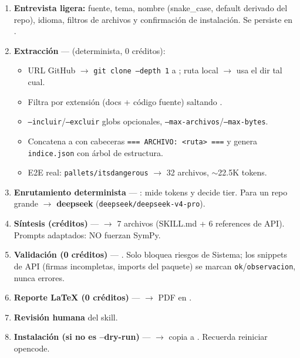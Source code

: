 \documentclass[11pt,a4paper]{article}
\begin{document}
\begin{enumerate}[leftmargin=*]
  \item \textbf{Entrevista ligera:} fuente, tema, nombre (snake\_case, default derivado del repo), idioma, filtros de archivos y confirmación de instalación. Se persiste en .
  \item \textbf{Extracción} ---  (determinista, 0 créditos):
  \begin{itemize}[leftmargin=*]
    \item URL GitHub $\to$ \texttt{git clone --depth 1} a ; ruta local $\to$ usa el dir tal cual.
    \item Filtra por extensión (docs + código fuente) saltando .
    \item \texttt{--incluir}/\texttt{--excluir} globs opcionales, \texttt{--max-archivos}/\texttt{--max-bytes}.
    \item Concatena a  con cabeceras \texttt{=== ARCHIVO: <ruta> ===} y genera \texttt{indice.json} con árbol de estructura.
    \item E2E real: \texttt{pallets/itsdangerous} $\to$ 32 archivos, $\sim$22.5K tokens.
  \end{itemize}
  \item \textbf{Enrutamiento determinista} --- : mide tokens y decide tier. Para un repo grande $\to$ \textbf{deepseek} (\texttt{deepseek/deepseek-v4-pro}).
  \item \textbf{Síntesis (créditos)} ---  $\to$ 7 archivos (SKILL.md + 6 references de API). Prompts adaptados: NO fuerzan SymPy.
  \item \textbf{Validación (0 créditos)} --- . Solo bloquea riesgos de Sistema; los snippets de API (firmas incompletas, imports del paquete) se marcan \texttt{ok}/\texttt{observacion}, nunca errores.
  \item \textbf{Reporte LaTeX (0 créditos)} ---  $\to$ PDF en .
  \item \textbf{Revisión humana} del skill.
  \item \textbf{Instalación (si no es --dry-run)} ---  $\to$ copia a . Recuerda reiniciar opencode.
\end{enumerate}
\end{document}

